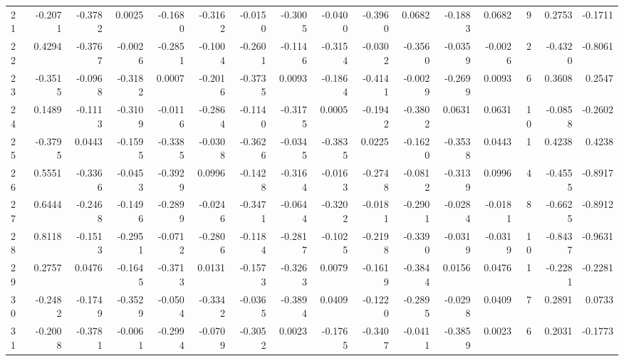 \begin{tabular}{lrrrrrrrrrrrrrrr}
21  &     -0.2071 & -0.3782 &  0.0025 & -0.1680 & -0.3162 & -0.0150 & -0.3005 & -0.0400 & -0.3960 &  0.0682 &  -0.1883 &     0.0682 &      9 &                    0.2753 &                    -0.1711 \\
22  &      0.4294 & -0.3767 & -0.0026 & -0.2851 & -0.1004 & -0.2601 & -0.1146 & -0.3154 & -0.0302 & -0.3560 &  -0.0359 &    -0.0026 &      2 &                   -0.4320 &                    -0.8061 \\
23  &     -0.3515 & -0.0968 & -0.3182 &  0.0007 & -0.2016 & -0.3735 &  0.0093 & -0.1864 & -0.4141 & -0.0029 &  -0.2699 &     0.0093 &      6 &                    0.3608 &                     0.2547 \\
24  &      0.1489 & -0.1113 & -0.3109 & -0.0116 & -0.2864 & -0.1140 & -0.3175 &  0.0005 & -0.1942 & -0.3802 &   0.0631 &     0.0631 &     10 &                   -0.0858 &                    -0.2602 \\
25  &     -0.3795 &  0.0443 & -0.1595 & -0.3385 & -0.0308 & -0.3626 & -0.0345 & -0.3835 &  0.0225 & -0.1620 &  -0.3538 &     0.0443 &      1 &                    0.4238 &                     0.4238 \\
26  &      0.5551 & -0.3366 & -0.0453 & -0.3929 &  0.0996 & -0.1428 & -0.3164 & -0.0163 & -0.2748 & -0.0812 &  -0.3139 &     0.0996 &      4 &                   -0.4555 &                    -0.8917 \\
27  &      0.6444 & -0.2468 & -0.1496 & -0.2899 & -0.0246 & -0.3471 & -0.0644 & -0.3202 & -0.0181 & -0.2901 &  -0.0284 &    -0.0181 &      8 &                   -0.6625 &                    -0.8912 \\
28  &      0.8118 & -0.1513 & -0.2951 & -0.0712 & -0.2806 & -0.1184 & -0.2817 & -0.1025 & -0.2198 & -0.3390 &  -0.0319 &    -0.0319 &     10 &                   -0.8437 &                    -0.9631 \\
29  &      0.2757 &  0.0476 & -0.1645 & -0.3713 &  0.0131 & -0.1573 & -0.3263 &  0.0079 & -0.1619 & -0.3844 &   0.0156 &     0.0476 &      1 &                   -0.2281 &                    -0.2281 \\
30  &     -0.2482 & -0.1749 & -0.3529 & -0.0504 & -0.3342 & -0.0365 & -0.3894 &  0.0409 & -0.1220 & -0.2895 &  -0.0298 &     0.0409 &      7 &                    0.2891 &                     0.0733 \\
31  &     -0.2008 & -0.3781 & -0.0061 & -0.2994 & -0.0709 & -0.3052 &  0.0023 & -0.1765 & -0.3407 & -0.0411 &  -0.3859 &     0.0023 &      6 &                    0.2031 &                    -0.1773 \\

\end{tabular}
